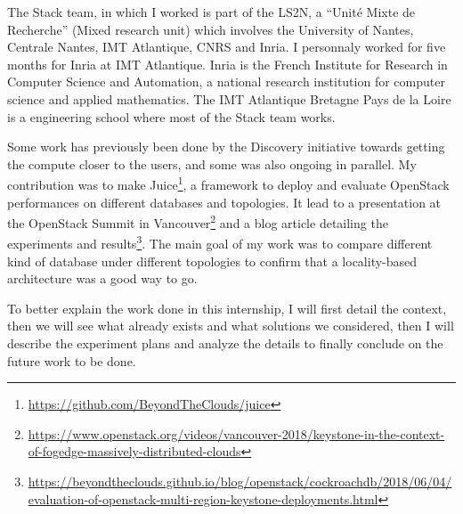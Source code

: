The Stack team, in which I worked is part of the LS2N, a ``Unité Mixte de Recherche'' (Mixed research unit) which involves the University of Nantes, Centrale Nantes, IMT Atlantique, CNRS and Inria. I personnaly worked for five months for Inria at IMT Atlantique. Inria is the French Institute for Research in Computer Science and Automation, a national research institution for computer science and applied mathematics. The IMT Atlantique Bretagne Pays de la Loire is a engineering school where most of the Stack team works.

Some work has previously been done by the Discovery initiative towards getting the compute closer to the users, and some was also ongoing in parallel. My contribution was to make Juice\footnote{\url{https://github.com/BeyondTheClouds/juice}}, a framework to deploy and evaluate OpenStack performances on different databases and topologies. It lead to a presentation at the OpenStack Summit in Vancouver\footnote{\url{https://www.openstack.org/videos/vancouver-2018/keystone-in-the-context-of-fogedge-massively-distributed-clouds}} and a blog article detailing the experiments and results\footnote{\url{https://beyondtheclouds.github.io/blog/openstack/cockroachdb/2018/06/04/evaluation-of-openstack-multi-region-keystone-deployments.html}}. The main goal of my work was to compare different kind of database under different topologies to confirm that a locality-based architecture was a good way to go.

To better explain the work done in this internship, I will first detail the context, then we will see what already exists and what solutions we considered, then I will describe the experiment plans and analyze the details to finally conclude on the future work to be done.
\fi
